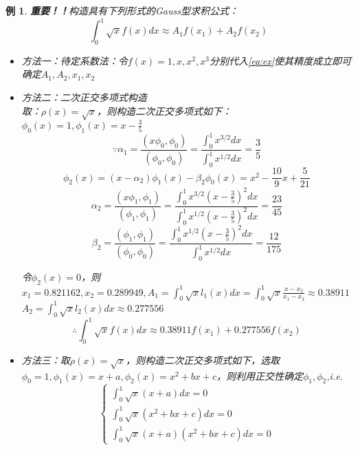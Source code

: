 \documentclass[a4paper]{article}
\newtheorem{example}{例}[section]
\begin{document}
\begin{example}
    \textbf{重要！！}构造具有下列形式的Gauss型求积公式：
    \begin{equation}
        \int^1_0\sqrt{x}f(x)dx\approx A_1f(x_1) + A_2f(x_2)
        \label{eq:ex}
    \end{equation}
    \begin{itemize}
        \item 方法一：待定系数法：令$f(x)=1,x,x^2,x^3$分别代入\ref{eq:ex}使其精度成立即可确定$A_1, A_2, x_1,x_2$
        \item 方法二：二次正交多项式构造\\
            取：$\rho(x) = \sqrt{x}$，则构造二次正交多项式如下：$\phi_0(x)=1, \phi_1(x)=x-\frac{3}{5}$
            $$\because \alpha_1 = \frac{(x\phi_0, \phi_0)}{(\phi_0, \phi_0)} = \frac{\int^1_0x^{3/2}dx}{\int^1_0x^{1/2}dx}=\frac{3}{5}$$
            $$\phi_2(x) = (x-\alpha_2)\phi_1(x)- \beta_2\phi_0(x) = x^2-\frac{10}{9}x+\frac{5}{21}$$
            $$\alpha_2 = \frac{(x\phi_1, \phi_1)}{(\phi_1, \phi_1)}=\frac{\int^1_0x^{3/2}(x-\frac{3}{5})^2dx}{\int^1_0x^{1/2}(x-\frac{3}{5})^2dx}=\frac{23}{45} $$
            $$\beta_2 = \frac{(\phi_1, \phi_1)}{(\phi_0, \phi_0)}=\frac{\int^1_0x^{1/2}(x-\frac{3}{5})^2dx}{\int^1_0x^{1/2}dx}=\frac{12}{175}$$

            令$\phi_2(x)=0$，则$x_1=0.821162, x_2=0.289949, A_1=\int^1_0\sqrt{x}l_1(x)dx = \int^1_0\sqrt{x}\frac{x-x_2}{x_1-x_2}\approx 0.38911$
            $A_2=\int^1_0\sqrt{x}l_2(x)dx \approx 0.277556$
            $$\therefore \int^1_0\sqrt{x}f(x)dx \approx 0.38911f(x_1)+0.277556f(x_2) $$
        \item 方法三：取$\rho(x)=\sqrt{x}$，则构造二次正交多项式如下，选取$\phi_0=1, \phi_1(x)=x+a, \phi_2(x)=x^2+bx+c$，则利用正交性确定$\phi_1, \phi_2$,i.e.
            $$
            \left\{
            \begin{array}{lr}
                \int^1_0\sqrt{x}(x+a)dx=0 \\
                \int^1_0\sqrt{x}(x^2+bx+c)dx=0 \\
                \int^1_0\sqrt{x}(x+a)(x^2+bx+c)dx=0
            \end{array}\right.
            $$
    \end{itemize}
\end{example}
\end{document}
